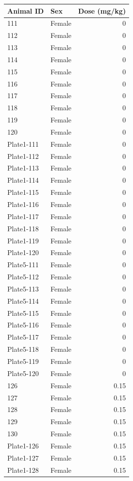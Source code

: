 \begin{longtable}{l l r}
\toprule
Animal ID & Sex & Dose (mg/kg) \\
\midrule
\endhead
111 & Female & 0 \\
112 & Female & 0 \\
113 & Female & 0 \\
114 & Female & 0 \\
115 & Female & 0 \\
116 & Female & 0 \\
117 & Female & 0 \\
118 & Female & 0 \\
119 & Female & 0 \\
120 & Female & 0 \\
Plate1-111 & Female & 0 \\
Plate1-112 & Female & 0 \\
Plate1-113 & Female & 0 \\
Plate1-114 & Female & 0 \\
Plate1-115 & Female & 0 \\
Plate1-116 & Female & 0 \\
Plate1-117 & Female & 0 \\
Plate1-118 & Female & 0 \\
Plate1-119 & Female & 0 \\
Plate1-120 & Female & 0 \\
Plate5-111 & Female & 0 \\
Plate5-112 & Female & 0 \\
Plate5-113 & Female & 0 \\
Plate5-114 & Female & 0 \\
Plate5-115 & Female & 0 \\
Plate5-116 & Female & 0 \\
Plate5-117 & Female & 0 \\
Plate5-118 & Female & 0 \\
Plate5-119 & Female & 0 \\
Plate5-120 & Female & 0 \\
126 & Female & 0.15 \\
127 & Female & 0.15 \\
128 & Female & 0.15 \\
129 & Female & 0.15 \\
130 & Female & 0.15 \\
Plate1-126 & Female & 0.15 \\
Plate1-127 & Female & 0.15 \\
Plate1-128 & Female & 0.15 \\

\end{longtable}
